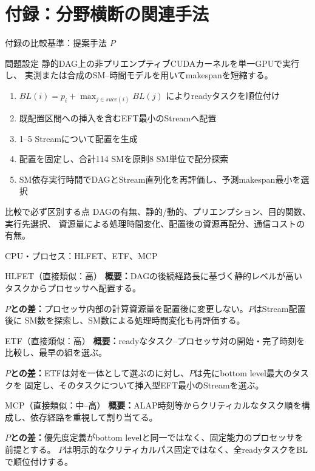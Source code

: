 \documentclass[aspectratio=169,10pt]{beamer}
\begin{document}
\appendix
\section{付録：分野横断の関連手法}

\begin{frame}{付録の比較基準：提案手法 $P$}
  \small
  \begin{block}{問題設定}
    静的DAG上の非プリエンプティブCUDAカーネルを単一GPUで実行し、
    実測または合成のSM--時間モデルを用いてmakespanを短縮する。
  \end{block}
  \begin{enumerate}
    \item $BL(i)=p_i+\max_{j\in succ(i)}BL(j)$ によりreadyタスクを順位付け
    \item 既配置区間への挿入を含むEFT最小のStreamへ配置
    \item 1--5 Streamについて配置を生成
    \item 配置を固定し、合計114 SMを原則8 SM単位で配分探索
    \item SM依存実行時間でDAGとStream直列化を再評価し、予測makespan最小を選択
  \end{enumerate}
  \begin{alertblock}{比較で必ず区別する点}
    DAGの有無、静的/動的、プリエンプション、目的関数、実行先選択、
    資源量による処理時間変化、配置後の資源再配分、通信コストの有無。
  \end{alertblock}
\end{frame}

\begin{frame}{CPU・プロセス：HLFET、ETF、MCP}
  \scriptsize
  \begin{block}{HLFET（直接類似：高）}
    \textbf{概要：}DAGの後続経路長に基づく静的レベルが高いタスクからプロセッサへ配置する。\par
    \textbf{$P$との差：}プロセッサ内部の計算資源量を配置後に変更しない。$P$はStream配置後に
    SM数を探索し、SM数による処理時間変化も再評価する。
  \end{block}
  \begin{block}{ETF（直接類似：高）}
    \textbf{概要：}readyなタスク--プロセッサ対の開始・完了時刻を比較し、最早の組を選ぶ。\par
    \textbf{$P$との差：}ETFは対を一体として選ぶのに対し、$P$は先にbottom level最大のタスクを
    固定し、そのタスクについて挿入型EFT最小のStreamを選ぶ。
  \end{block}
  \begin{block}{MCP（直接類似：中--高）}
    \textbf{概要：}ALAP時刻等からクリティカルなタスク順を構成し、依存経路を重視して割り当てる。\par
    \textbf{$P$との差：}優先度定義がbottom levelと同一ではなく、固定能力のプロセッサを前提とする。
    $P$は明示的なクリティカルパス固定ではなく、全readyタスクをBLで順位付けする。
  \end{block}
\end{frame}
\end{document}
